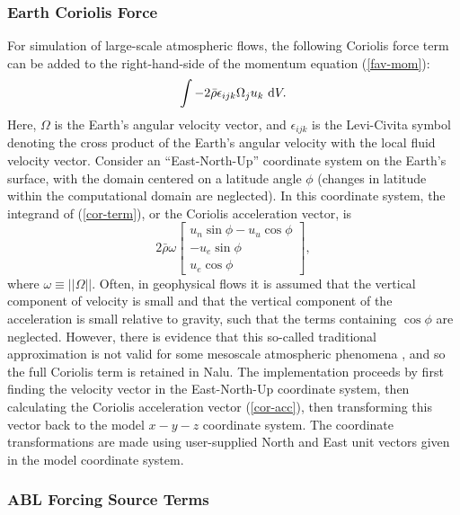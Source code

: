 \subsubsection{Earth Coriolis Force}
For simulation of large-scale atmospheric flows, the following Coriolis force
term can be added to the right-hand-side of the momentum equation
(\ref{fav-mom}):
\begin{equation} \label{cor-term}
  \int -2\bar{\rho}\epsilon_{ijk}\Omega_ju_k ~{\rm d}V.
\end{equation}
Here, $\Omega$ is the Earth's angular velocity vector, and
$\epsilon_{ijk}$ is the Levi-Civita symbol denoting the cross product
of the Earth's angular velocity with the local fluid velocity
vector. Consider an ``East-North-Up'' coordinate system on the Earth's
surface, with the domain centered on a latitude angle $\phi$ (changes
in latitude within the computational domain are neglected). In this
coordinate system, the integrand of (\ref{cor-term}), or the Coriolis
acceleration vector, is
\begin{equation} \label{cor-acc}
  2 \bar{\rho} \omega
  \begin{bmatrix} u_n \sin\phi - u_u \cos\phi \\
                  -u_e \sin\phi \\
                  u_e \cos\phi
  \end{bmatrix},
\end{equation}
where $\omega \equiv ||\Omega||$.  Often, in geophysical flows it is
assumed that the vertical component of velocity is small and that the
vertical component of the acceleration is small relative to gravity,
such that the terms containing $\cos\phi$ are neglected.  However,
there is evidence that this so-called traditional approximation is not
valid for some mesoscale atmospheric phenomena \cite{Gerkema_etal:08},
and so the full Coriolis term is retained in Nalu.  The implementation
proceeds by first finding the velocity vector in the East-North-Up
coordinate system, then calculating the Coriolis acceleration vector
(\ref{cor-acc}), then transforming this vector back to the model
$x-y-z$ coordinate system.  The coordinate transformations are made
using user-supplied North and East unit vectors given in the model
coordinate system.

\subsubsection{ABL Forcing Source Terms} \label{sec:abl-forcing}

